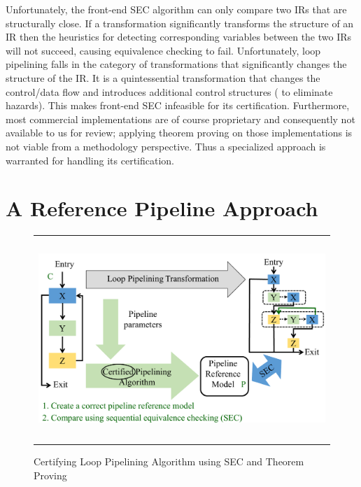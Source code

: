  Unfortunately, the front-end SEC
algorithm can only compare two IRs that are structurally close.  If a
transformation significantly transforms the structure of an IR then
the heuristics for detecting corresponding variables between the two
IRs will not succeed, causing equivalence checking to fail.
Unfortunately, loop pipelining falls in the category of
transformations that significantly changes the structure of the IR.
It is a quintessential transformation that changes the control/data
flow and introduces additional control structures (%
to eliminate
hazards).  This makes front-end SEC infeasible for its certification.
Furthermore, most commercial implementations are of course
proprietary and consequently not available to us for review; applying
theorem proving on those implementations is not viable from a
methodology perspective.  Thus a specialized approach is warranted for
handling its certification.

\section{A Reference Pipeline Approach}
\label{subsec:reference-pipeline}

\begin{figure}[t!]
\begin{center}
\begin{tabular}{c}
\includegraphics[height=3in]{fig-proposal/ref-pipeline-approach}
\end{tabular}
\end{center}
\caption{Certifying Loop Pipelining Algorithm using SEC and Theorem Proving}
\label{fig:ref-pipeline-approach}
\end{figure}

